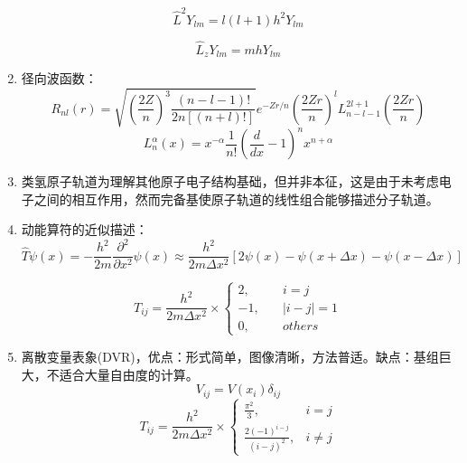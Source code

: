\begin{enumerate}
	\begin{equation}
	\hat{L}^2Y_{lm}=l(l+1)h^2Y_{lm}
	\end{equation}

	\begin{equation}
	\hat{L}_zY_{lm}=mhY_{lm}
	\end{equation}

	\item 径向波函数：
	\begin{equation}
	R_{nl}(r)=\sqrt{(\frac{2Z}{n})^3\frac{(n-l-1)!}{2n[(n+l)!]}}e^{-Zr/n}(\frac{2Zr}{n})^lL^{2l+1}_{n-l-1}(\frac{2Zr}{n})
	\end{equation}
	\begin{equation}
	L_n^\alpha(x)=x^{-\alpha}\frac{1}{n!}(\frac{d}{dx}-1)^nx^{n+\alpha}
	\end{equation}

	\item 类氢原子轨道为理解其他原子电子结构基础，但并非本征，这是由于未考虑电子之间的相互作用，然而完备基使原子轨道的线性组合能够描述分子轨道。


	\item 动能算符的近似描述：
	\begin{equation}
	\hat{T}\psi(x)=-\frac{h^2}{2m}\frac{\partial^2}{\partial x^2}\psi(x)\approx\frac{h^2}{2m\Delta x^2}[2\psi(x)-\psi(x+\Delta x)-\psi(x-\Delta x)]
	\end{equation}

	\begin{equation}
	T_{ij}=\frac{h^2}{2m\Delta x^2}\times
	\begin{cases}
	2,&\quad i=j\\
	-1,&\quad |i-j|=1\\
	0,&\quad others
	\end{cases}
	\end{equation}


	\item 离散变量表象(DVR)，优点：形式简单，图像清晰，方法普适。缺点：基组巨大，不适合大量自由度的计算。
	\begin{equation}
	V_{ij}=V(x_i)\delta_{ij}
	\end{equation}
	\begin{equation}
	T_{ij}=\frac{h^2}{2m\Delta x^2}\times
	\begin{cases}
	\frac{\pi^2}{3}, &i=j\\
	\frac{2(-1)^{i-j}}{(i-j)^2},&i\neq j
	\end{cases}
	\end{equation}
\end{enumerate}


